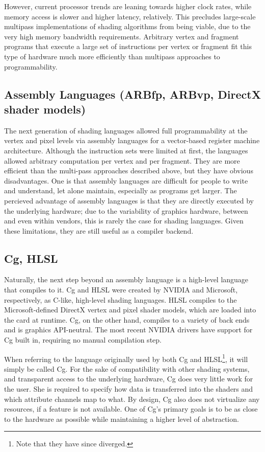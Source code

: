 \documentclass[review]{acmsiggraph}      %
\begin{document}
However, current processor trends are leaning towards higher clock rates,
while memory access is slower and higher latency, relatively.  This
precludes large-scale multipass implementations of shading algorithms
from being viable, due to the very high memory bandwidth requirements.
Arbitrary vertex and fragment programs that execute a large set of
instructions per vertex or fragment fit this type of hardware much
more efficiently than multipass approaches to programmability.


\subsection{Assembly Languages (ARBfp, ARBvp, DirectX shader models)}

The next generation of shading languages allowed full programmability at the
vertex and pixel levels via assembly languages for a vector-based register
machine architecture.  Although the instruction sets were limited at first,
the languages allowed arbitrary computation per vertex and per fragment. 
They are more efficient than the multi-pass approaches described above, but
they have obvious disadvantages.  One is that assembly languages are
difficult for people to write and understand, let alone maintain, especially
as programs get larger.  The percieved advantage of assembly languages is
that they are directly executed by the underlying hardware; due to the
variability of graphics hardware, between and even within vendors, this is
rarely the case for shading languages.  Given these limitations, they are
still useful as a compiler backend.


\subsection{Cg, HLSL}

Naturally, the next step beyond an assembly language is a high-level
language that compiles to it.  Cg \cite{mark03cg} and HLSL were
created by NVIDIA and Microsoft, respectively, as C-like, high-level
shading languages.  HLSL compiles to the Microsoft-defined DirectX
vertex and pixel shader models, which are loaded into the card at
runtime.  Cg, on the other hand, compiles to a variety of back ends
and is graphics API-neutral.  The most recent NVIDIA drivers have
support for Cg built in, requiring no manual compilation
step.

When referring to the language originally used by both Cg and
HLSL\footnote{Note that they have since diverged.}, it will simply be called
Cg.  For the sake of compatibility with other shading systems, and
transparent access to the underlying hardware, Cg does very little work for
the user. She is required to specify how data is transferred into the
shaders and which attribute channels map to what. By design, Cg also does
not virtualize any resources, if a feature is not available.  One of Cg's
primary goals is to be as close to the hardware as possible while
maintaining a higher level of abstraction.
\end{document}

